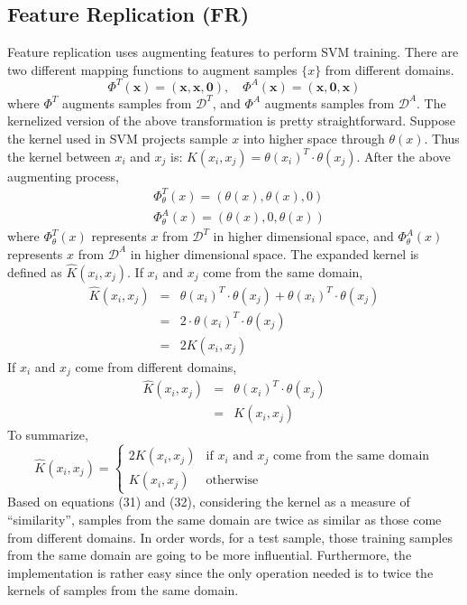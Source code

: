 \subsection{Feature Replication (FR)}
Feature replication \cite{daume2007frustratingly} uses augmenting features to perform SVM training. There are two different mapping functions to augment samples $\{x\}$ from different domains. 
\begin{equation}
\Phi^T(\mathbf{x}) = (\mathbf{x},\mathbf{x},\mathbf{0}), \quad  \Phi^A(\mathbf{x}) = (\mathbf{x},\mathbf{0}, \mathbf{x})
\end{equation}
where $\Phi^T$ augments samples from $\mathcal{D}^T$, and $\Phi^A$ augments samples from $\mathcal{D}^A$. The kernelized version of the above transformation is pretty straightforward. Suppose the kernel used in SVM projects sample $x$ into higher space through $\theta(x)$. Thus the kernel between $x_i$ and $x_j$ is: $K(x_i, x_j) = \theta(x_i)^T \cdot \theta(x_j)$. After the above augmenting process, 
\begin{eqnarray}
& \Phi_{\theta}^T(x) = (\theta(x), \theta(x), 0) \nonumber \\
& \Phi_{\theta}^A(x) = (\theta(x), 0, \theta(x)) 
\end{eqnarray}
where $\Phi_{\theta}^T(x)$ represents $x$ from $\mathcal{D}^T$ in higher dimensional space, and $\Phi_{\theta}^A(x)$ represents $x$ from $\mathcal{D}^A$ in higher dimensional space. The expanded kernel is defined as $\hat K(x_i, x_j)$. If $x_i$ and $x_j$ come from the same domain, 
\begin{eqnarray}
\hat K(x_i, x_j) &  = & \theta(x_i)^T \cdot \theta(x_j) + \theta(x_i)^T \cdot \theta(x_j) \nonumber \\
 & = & 2 \cdot \theta(x_i)^T \cdot \theta(x_j)   \nonumber \\
 & = & 2 K(x_i, x_j)
\end{eqnarray}
\noindent If  $x_i$ and $x_j$ come from different domains,
\begin{eqnarray}
\hat K(x_i, x_j)  & = &  \theta(x_i)^T \cdot \theta(x_j)  \nonumber \\
 & = &  K(x_i, x_j) 
\end{eqnarray}
\noindent To summarize,  
\[
 \hat K(x_i, x_j) =
  \begin{cases}
   2 K(x_i, x_j) & \text{if } x_i \text{ and } x_j \text{ come from the same domain}\\
   K(x_i, x_j)   & \text{otherwise} 
  \end{cases}
\]
\noindent Based on equations (31) and (32), considering the kernel as a measure of ``similarity'', samples from the same domain are twice as similar as those come from different domains. In order words, for a test sample, those training samples from the same domain  are going to be more influential. Furthermore, the implementation is rather easy since the only operation needed is to twice the kernels of samples from the same domain. 

